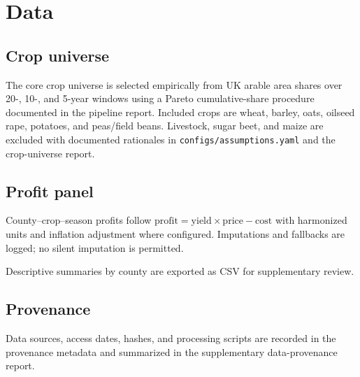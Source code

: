 \section{Data}
\label{sec:data}

\subsection{Crop universe}

The core crop universe is selected empirically from UK arable area shares over 20-, 10-, and
5-year windows using a Pareto cumulative-share procedure documented in the pipeline report.
Included crops are wheat, barley, oats, oilseed rape, potatoes, and peas/field beans.
Livestock, sugar beet, and maize are excluded with documented rationales in
\texttt{configs/assumptions.yaml} and the crop-universe report.




\subsection{Profit panel}

County--crop--season profits follow
$\text{profit} = \text{yield} \times \text{price} - \text{cost}$
with harmonized units and inflation adjustment where configured.
Imputations and fallbacks are logged; no silent imputation is permitted.


Descriptive summaries by county are exported as CSV for supplementary review.

\subsection{Provenance}

Data sources, access dates, hashes, and processing scripts are recorded in the provenance
metadata and summarized in the supplementary data-provenance report.
